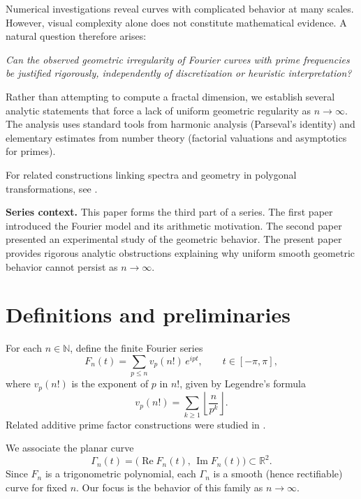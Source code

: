 \documentclass[11pt]{article}
\theoremstyle{plain}
\newcommand{\N}{\mathbb{N}}
\newcommand{\R}{\mathbb{R}}
\DeclareMathOperator{\Real}{Re}
\DeclareMathOperator{\Imag}{Im}
\begin{document}
Numerical investigations reveal curves with complicated behavior at many scales. However, visual complexity alone does not constitute mathematical evidence. A natural question therefore arises:

\medskip
\noindent\emph{Can the observed geometric irregularity of Fourier curves with prime frequencies be justified rigorously, independently of discretization or heuristic interpretation?}
\medskip

Rather than attempting to compute a fractal dimension, we establish several analytic statements that force a lack of uniform geometric regularity as $n\to\infty$. The analysis uses standard tools from harmonic analysis (Parseval's identity) and elementary estimates from number theory (factorial valuations and asymptotics for primes).

For related constructions linking spectra and geometry in polygonal transformations, see \cite{VartziotisWipper2010}.

\medskip
\noindent\textbf{Series context.}
This paper forms the third part of a series.
The first paper \cite{Vartziotis2026a} introduced the Fourier model and its arithmetic motivation.
The second paper \cite{Vartziotis2026b} presented an experimental study of the geometric behavior.
The present paper provides rigorous analytic obstructions explaining why uniform smooth geometric behavior cannot persist as $n\to\infty$.

\section{Definitions and preliminaries}

For each $n\in\N$, define the finite Fourier series
\begin{equation}\label{eq:Fn}
F_n(t)=\sum_{p\le n} v_p(n!)\, e^{i p t},
\qquad t\in[-\pi,\pi],
\end{equation}
where $v_p(n!)$ is the exponent of $p$ in $n!$, given by Legendre's formula
\begin{equation}\label{eq:legendre}
v_p(n!)=\sum_{k\ge1}\left\lfloor\frac{n}{p^k}\right\rfloor.
\end{equation}
Related additive prime factor constructions were studied in \cite{VartziotisTzavellas2016}.

We associate the planar curve
\begin{equation}\label{eq:curve}
\Gamma_n(t)=\big(\Real F_n(t),\,\Imag F_n(t)\big)\subset\R^2.
\end{equation}
Since $F_n$ is a trigonometric polynomial, each $\Gamma_n$ is a smooth (hence rectifiable) curve for fixed $n$.
Our focus is the behavior of this family as $n\to\infty$.
\end{document}
